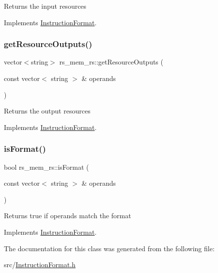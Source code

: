 Returns the input resources 

Implements \hyperlink{classInstructionFormat_a09775d3a3c22f40a0f44504664e586e4}{Instruction\+Format}.

\mbox{\label{classrs__mem__rs_ad93e4a2a21f172863e3daf317db69ad1}} 
\subsubsection{\texorpdfstring{get\+Resource\+Outputs()}{getResourceOutputs()}}
{\footnotesize\ttfamily vector$<$string$>$ rs\+\_\+mem\+\_\+rs\+::get\+Resource\+Outputs (\begin{DoxyParamCaption}\item[{const vector$<$ string $>$ \&}]{operands }\end{DoxyParamCaption})\hspace{0.3cm}{\ttfamily [virtual]}}

Returns the output resources 

Implements \hyperlink{classInstructionFormat_a95cd28ffb1bde59b67f676880ab10536}{Instruction\+Format}.

\mbox{\label{classrs__mem__rs_abf2731ea9f051772088147dcecb111dc}} 
\subsubsection{\texorpdfstring{is\+Format()}{isFormat()}}
{\footnotesize\ttfamily bool rs\+\_\+mem\+\_\+rs\+::is\+Format (\begin{DoxyParamCaption}\item[{const vector$<$ string $>$ \&}]{operands }\end{DoxyParamCaption})\hspace{0.3cm}{\ttfamily [virtual]}}

Returns true if operands match the format 

Implements \hyperlink{classInstructionFormat_a9fdcf94dcd7d9a55ba86e7a63f04d1fe}{Instruction\+Format}.



The documentation for this class was generated from the following file\+:\begin{DoxyCompactItemize}
\item 
src/\hyperlink{InstructionFormat_8h}{Instruction\+Format.\+h}\end{DoxyCompactItemize}
